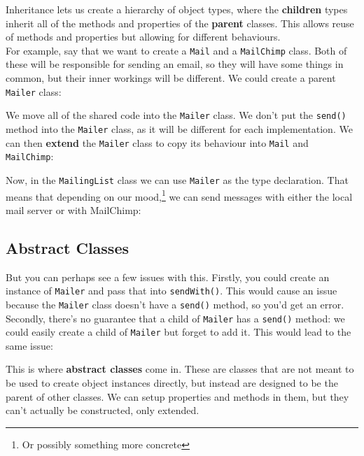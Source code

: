 Inheritance lets us create a hierarchy of object types, where the \textbf{children} types inherit all of the methods and properties of the \textbf{parent} classes. This allows reuse of methods and properties but allowing for different behaviours.
\\

For example, say that we want to create a \texttt{Mail} and a \texttt{MailChimp} class. Both of these will be responsible for sending an email, so they will have some things in common, but their inner workings will be different. We could create a parent \texttt{Mailer} class:


We move all of the shared code into the \texttt{Mailer} class. We don't put the \texttt{send()} method into the \texttt{Mailer} class, as it will be different for each implementation. We can then \textbf{extend} the \texttt{Mailer} class to copy its behaviour into \texttt{Mail} and \texttt{MailChimp}:


Now, in the \texttt{MailingList} class we can use \texttt{Mailer} as the type declaration. That means that depending on our mood,\footnote{Or possibly something more concrete} we can send messages with either the local mail server or with MailChimp:



\subsection{Abstract Classes}

But you can perhaps see a few issues with this. Firstly, you could create an instance of \texttt{Mailer} and pass that into \texttt{sendWith()}. This would cause an issue because the \texttt{Mailer} class doesn't have a \texttt{send()} method, so you'd get an error. Secondly, there's no guarantee that a child of \texttt{Mailer} has a \texttt{send()} method: we could easily create a child of \texttt{Mailer} but forget to add it. This would lead to the same issue:


This is where \textbf{abstract classes} come in. These are classes that are not meant to be used to create object instances directly, but instead are designed to be the parent of other classes. We can setup properties and methods in them, but they can't actually be constructed, only extended.
\\

